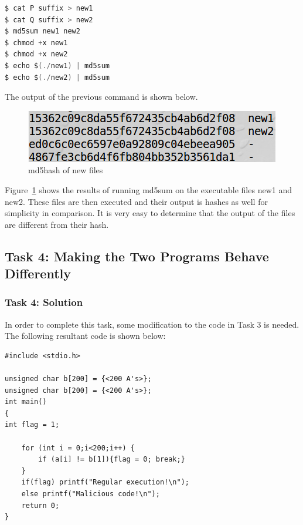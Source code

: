 \documentclass[12pt]{article}
\begin{document}
\begin{lstlisting}[backgroundcolor = \color{lightgray},
language = C,
xleftmargin = 2cm,
framexleftmargin = 1em]
$ cat P suffix > new1
$ cat Q suffix > new2
$ md5sum new1 new2
$ chmod +x new1
$ chmod +x new2
$ echo $(./new1) | md5sum
$ echo $(./new2) | md5sum
\end{lstlisting}

The output of the previous command is shown below.

\begin{figure}[H]
	\begin{center}
		\includegraphics[scale=0.65]{pics/t3p1.png}
	\end{center}{}
	\caption{md5hash of new files}
	\label{fig:t3p1}
\end{figure}

Figure~\ref{fig:t3p1} shows the results of running md5sum on the executable files new1 and new2. These files are then executed and their output is hashes as well for simplicity in comparison. It is very easy to determine that the output of the files are different from their hash.


\subsection{Task 4: Making the Two Programs Behave Differently}
\subsubsection{Task 4: Solution}


In order to complete this task, some modification to the code in Task 3 is needed. The following resultant code is shown below:

\begin{verbatim}
#include <stdio.h>

unsigned char b[200] = {<200 A's>};
unsigned char b[200] = {<200 A's>};
int main()
{
int flag = 1;

    for (int i = 0;i<200;i++) {
        if (a[i] != b[1]){flag = 0; break;}
    }
    if(flag) printf("Regular execution!\n");
    else printf("Malicious code!\n");
    return 0;
}

\end{verbatim}
\end{document}

